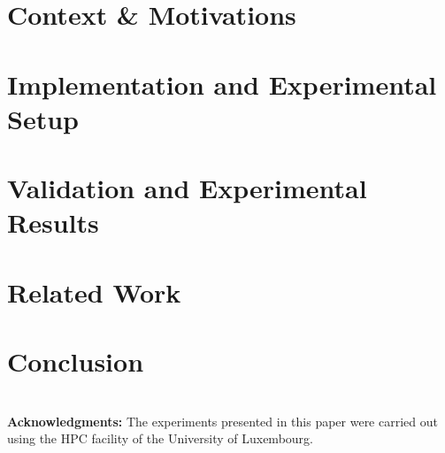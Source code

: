 \documentclass{sig-alternate}
\begin{document}
\section{Context \& Motivations}
\label{sec:context}


\section{Implementation and Experimental Setup}
\label{sec:implem}\label{sec:experimental_setup}


\section{Validation and Experimental Results}
\label{sec:experiments}


\section{Related Work}
\label{sec:related_works}


\section{Conclusion}
\label{sec:conclusion}


~\\
{\noindent \textbf{Acknowledgments:}}
The experiments presented in this paper were carried
out using the HPC facility of the University of Luxembourg.




\appendix



\end{document}
